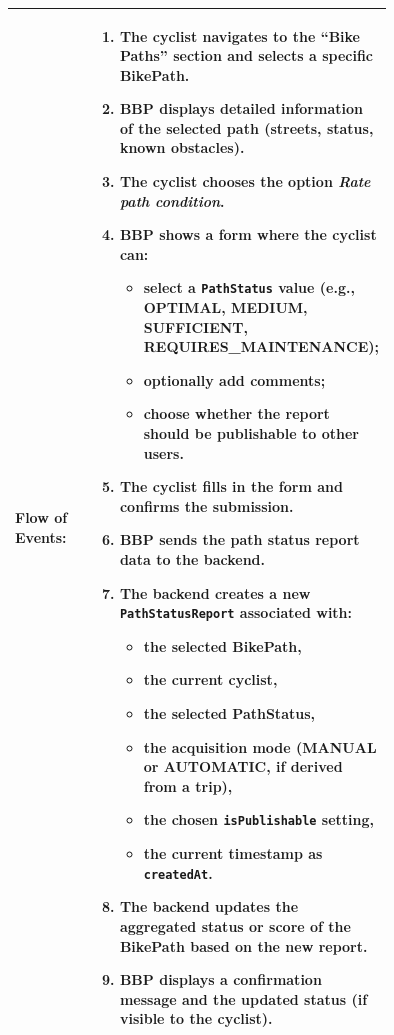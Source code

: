 \begin{center}
\begin{longtable}{|l|p{0.75\linewidth}|}
    \textbf{Flow of Events:}   
    & \begin{enumerate}
          \item The cyclist navigates to the “Bike Paths” section and selects a specific BikePath.
          \item BBP displays detailed information of the selected path (streets, status, known obstacles).
          \item The cyclist chooses the option \emph{Rate path condition}.
          \item BBP shows a form where the cyclist can:
                \begin{itemize}
                    \item select a \texttt{PathStatus} value (e.g., OPTIMAL, MEDIUM, SUFFICIENT, REQUIRES\_MAINTENANCE);
                    \item optionally add comments;
                    \item choose whether the report should be publishable to other users.
                \end{itemize}
          \item The cyclist fills in the form and confirms the submission.
          \item BBP sends the path status report data to the backend.
          \item The backend creates a new \texttt{PathStatusReport} associated with:
                \begin{itemize}
                    \item the selected BikePath,
                    \item the current cyclist,
                    \item the selected PathStatus,
                    \item the acquisition mode (MANUAL or AUTOMATIC, if derived from a trip),
                    \item the chosen \texttt{isPublishable} setting,
                    \item the current timestamp as \texttt{createdAt}.
                \end{itemize}
          \item The backend updates the aggregated status or score of the BikePath based on the new report.
          \item BBP displays a confirmation message and the updated status (if visible to the cyclist).
       \end{enumerate}                                                                          \\
    \hline


\end{longtable}
\end{center}
